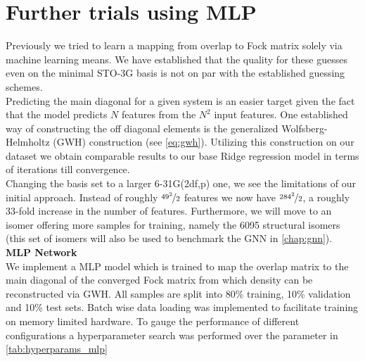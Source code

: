 \section{Further trials using MLP}
\label{sec:further_trials_mlp}
Previously we tried to learn a mapping from overlap to Fock matrix solely via machine learning means. We have established that the quality for these guesses even on the minimal STO-3G basis is not on par with the established guessing schemes.\\
Predicting the main diagonal for a given system is an easier target given the fact that the model predicts $N$ features from the $N^2$ input features. One established way of constructing the off diagonal elements is the generalized Wolfsberg-Helmholtz (GWH) construction \parencite{ref:gwh_wolfsberg1952spectra} (see \autoref{eq:gwh}).
Utilizing this construction on our dataset we obtain comparable results to our base Ridge regression model in terms of iterations till convergence. \\
Changing the basis set to a larger 6-31G(2df,p) one, we see the limitations of our initial approach. Instead of roughly $\nicefrac{49^2}{2}$ features we now have $\nicefrac{284^2}{2}$, a roughly 33-fold increase in the number of features. Furthermore, we will move to an isomer offering more samples for training, namely the 6095  structural isomers (this set of isomers will also be used to benchmark the GNN in \autoref{chap:gnn}).\\

\textbf{MLP Network}\\
We implement a MLP model which is trained to map the overlap matrix to the main diagonal of the converged Fock matrix from which density can be reconstructed via GWH. All samples are split into 80\% training, 10\% validation and 10\% test sets. Batch wise data loading was implemented to facilitate training on memory limited hardware. To gauge the performance of different configurations a hyperparameter search was performed over the parameter in \autoref{tab:hyperparams_mlp}

